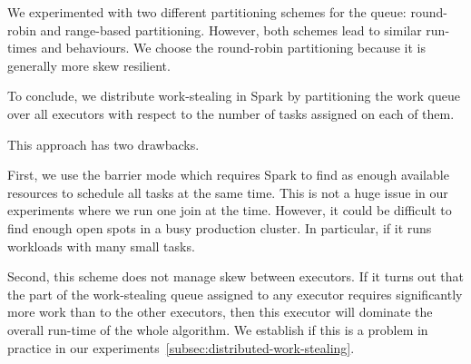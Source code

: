 We experimented with two different partitioning schemes for the queue: round-robin and range-based partitioning.
However, both schemes lead to similar run-times and behaviours.
We choose the round-robin partitioning because it is generally more skew resilient.

To conclude, we distribute work-stealing in Spark by partitioning the work queue over all executors with respect to the
number of tasks assigned on each of them.

This approach has two drawbacks.

First, we use the barrier mode which requires Spark to find as enough available resources to schedule all tasks at the same time.
This is not a huge issue in our experiments where we run one join at the time.
However, it could be difficult to find enough open spots in a busy production cluster.
In particular, if it runs workloads with many small tasks.

Second, this scheme does not manage skew between executors.
If it turns out that the part of the work-stealing queue assigned to any executor requires significantly more work than
to the other executors, then this executor will dominate the overall run-time of the whole algorithm.
We establish if this is a problem in practice in our experiments~\cref{subsec:distributed-work-stealing}.
